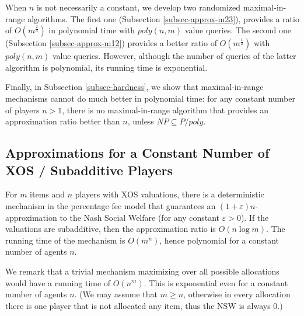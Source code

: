 \documentclass{theoretics}
\newcommand{\eps}{\varepsilon}
\begin{document}
When $n$ is not necessarily a constant, we develop two randomized maximal-in-range algorithms. The first one (Subsection \ref{subsec-approx-m23}), provides a ratio of $O(m^{\frac 2 3})$ in polynomial time with $poly(n,m)$ value queries. The second one (Subsection \ref{subsec-approx-m12}) provides a better ratio of $O(m^{\frac12})$ with $poly(n,m)$ value queries. However, although the number of queries of the latter algorithm is polynomial, its running time is exponential.

Finally, in Subsection \ref{subsec-hardness}, we show that maximal-in-range mechanisms cannot do much better in polynomial time: for any constant number of players $n>1$, there is no maximal-in-range algorithm that provides an approximation ratio better than $n$, unless $NP\subseteq P/poly$.  


\subsection{Approximations for a Constant Number of XOS / Subadditive Players}\label{subsec-approx-constant-number}

\begin{theorem}
For $m$ items and $n$ players with XOS valuations, there is a deterministic mechanism in the percentage fee model that guarantees an $(1+\eps)n$-approximation to the Nash Social Welfare (for any constant $\eps>0$). If the valuations are subadditive, then the approximation ratio is $O(n \log m)$. The running time of the mechanism is $O(m^n)$, hence polynomial for a constant number of agents $n$.
\end{theorem} 

We remark that a trivial mechanism maximizing over all possible allocations would have a running time of $O(n^m)$. This is exponential even for a constant number of agents $n$. (We may assume that $m \geq n$, otherwise in every allocation there is one player that is not allocated any item, thus the NSW is always $0$.)
\end{document}
